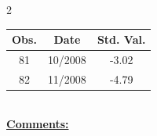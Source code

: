 
\bigskip 
\begin{multicols}{2}{ 
\begin{tabular}{ccc}
\hline  Obs.  &  Date &  Std. Val. \\ 
\hline 
                       81 &       10/2008 &         -3.02 \vspace{-.12in} \\  
                       82 &       11/2008 &         -4.79 \vspace{-.12in} \\  
 \end{tabular} 
\\ 
 \columnbreak 
 \singlespacing 
 \underline{\textbf{Comments:}} \\ 
 \bigskip       

 } 
\end{multicols} 
